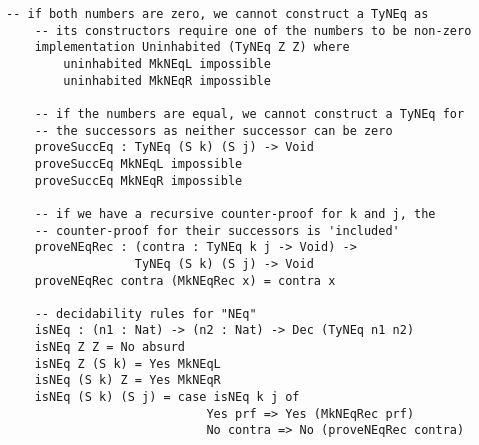     \begin{lstlisting}[caption={Decidability rules for inequality}]
    -- if both numbers are zero, we cannot construct a TyNEq as
    -- its constructors require one of the numbers to be non-zero
    implementation Uninhabited (TyNEq Z Z) where
        uninhabited MkNEqL impossible
        uninhabited MkNEqR impossible

    -- if the numbers are equal, we cannot construct a TyNEq for      
    -- the successors as neither successor can be zero
    proveSuccEq : TyNEq (S k) (S j) -> Void
    proveSuccEq MkNEqL impossible
    proveSuccEq MkNEqR impossible
    
    -- if we have a recursive counter-proof for k and j, the
    -- counter-proof for their successors is 'included'
    proveNEqRec : (contra : TyNEq k j -> Void) ->
                  TyNEq (S k) (S j) -> Void
    proveNEqRec contra (MkNEqRec x) = contra x
    
    -- decidability rules for "NEq"
    isNEq : (n1 : Nat) -> (n2 : Nat) -> Dec (TyNEq n1 n2)
    isNEq Z Z = No absurd
    isNEq Z (S k) = Yes MkNEqL
    isNEq (S k) Z = Yes MkNEqR
    isNEq (S k) (S j) = case isNEq k j of
                            Yes prf => Yes (MkNEqRec prf)
                            No contra => No (proveNEqRec contra)
    \end{lstlisting}
